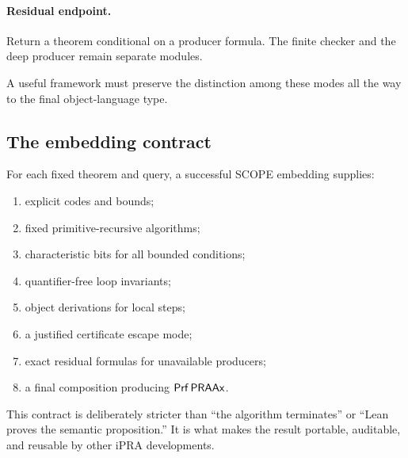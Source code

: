 \paragraph{Residual endpoint.}
Return a theorem conditional on a producer formula.  The finite checker and the deep producer remain separate modules.

A useful framework must preserve the distinction among these modes all the way to the final object-language type.

\subsection{The embedding contract}

For each fixed theorem and query, a successful SCOPE embedding supplies:

\begin{enumerate}
\item explicit codes and bounds;
\item fixed primitive-recursive algorithms;
\item characteristic bits for all bounded conditions;
\item quantifier-free loop invariants;
\item object derivations for local steps;
\item a justified certificate escape mode;
\item exact residual formulas for unavailable producers;
\item a final composition producing \(\mathsf{Prf}\,\mathsf{PRAAx}\).
\end{enumerate}

This contract is deliberately stricter than ``the algorithm terminates'' or ``Lean proves the semantic proposition.''  It is what makes the result portable, auditable, and reusable by other iPRA developments.
